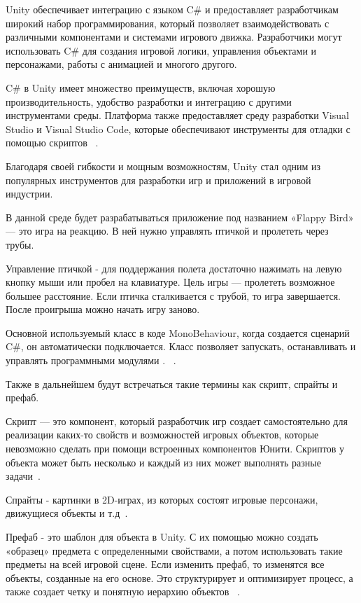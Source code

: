 \documentclass[14pt, oneside]{altsu-report}
\begin{document}
Unity обеспечивает интеграцию с языком C\# и предоставляет разработчикам широкий набор программирования, который позволяет взаимодействовать с различными компонентами и системами игрового движка. Разработчики могут использовать C\# для создания игровой логики, управления объектами и персонажами, работы с анимацией и многого другого. 

C\# в Unity имеет множество преимуществ, включая хорошую производительность, удобство разработки и интеграцию с другими инструментами среды. Платформа также предоставляет среду разработки Visual Studio и Visual Studio Code, которые обеспечивают инструменты для отладки с помощью скриптов ~\cite{Unity3, Unity4}. 

Благодаря своей гибкости и мощным возможностям, Unity стал одним из популярных инструментов для разработки игр и приложений в игровой индустрии.

В данной среде будет разрабатываться приложение под названием «Flappy Bird» — это игра на реакцию. В ней нужно управлять птичкой и пролететь через трубы.

Управление птичкой - для поддержания полета достаточно нажимать на левую кнопку мыши или пробел на клавиатуре. Цель игры — пролететь возможное большее расстояние. Если птичка сталкивается с трубой, то игра завершается. После проигрыша можно начать игру заново.

Основной используемый класс в коде MonoBehaviour, когда создается сценарий C\#, он автоматически подключается. Класс позволяет запускать, останавливать и управлять программными модулями . ~\cite{Unity6}. 

Также в дальнейшем будут встречаться такие термины как скрипт, спрайты и префаб. 

Скрипт — это компонент, который разработчик игр создает самостоятельно для реализации каких-то свойств и возможностей игровых объектов, которые невозможно сделать при помощи встроенных компонентов Юнити. Скриптов у объекта может быть несколько и каждый из них может выполнять разные задачи~\cite{Unity8}. 

Спрайты - картинки в 2D-играх, из которых состоят игровые персонажи, движущиеся объекты и т.д~\cite{Unity9}. 

Префаб - это шаблон для объекта в Unity. С их помощью можно создать «образец» предмета с определенными свойствами, а потом использовать такие предметы на всей игровой сцене. Если изменить префаб, то изменятся все объекты, созданные на его основе. Это структурирует и оптимизирует процесс, а также создает четку и понятную иерархию объектов ~\cite{Unity7}.
\end{document}
